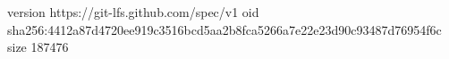 version https://git-lfs.github.com/spec/v1
oid sha256:4412a87d4720ee919c3516bcd5aa2b8fca5266a7e22e23d90c93487d76954f6c
size 187476
